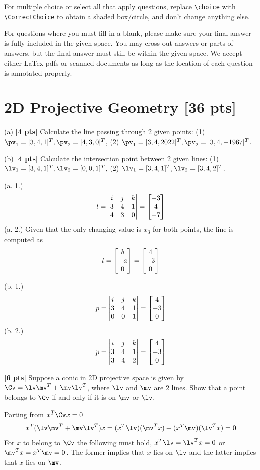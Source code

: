 \documentclass[11pt]{exam}
\numberwithin{equation}{section} %
\numberwithin{figure}{section} %
\numberwithin{table}{section} %
\begin{document}
For multiple choice or select all that apply questions, replace
\lstinline{\choice} with \lstinline{\CorrectChoice} to obtain a shaded
box/circle, and don't change anything else.

For questions where you must fill in a blank, please make sure your final
answer is fully included in the given space. You may cross out answers or parts
of answers, but the final answer must still be within the given space. We
accept either LaTex pdfs or scanned documents as long as the location of each
question is annotated properly.

\clearpage

\section{2D Projective Geometry  [36 pts]}
\begin{questions}

    \question (a) \textbf{[4 pts]} Calculate the line passing through 2 given points: (1) $\pv_1= [3,4,1]^T, \pv_2 = [4,3,0]^T$, (2) $\pv_1= [3,4,2022]^T, \pv_2 = [3,4,-1967]^T$.

    (b) \textbf{[4 pts]} Calculate the intersection point between 2 given lines: (1) $\lv_1 = [3,4,1]^T, \lv_2 = [0,0,1]^T $, (2) $\lv_1= [3,4,1]^T, \lv_2 = [3,4,2]^T$.

    \begin{tcolorbox}[height fill, width=\textwidth, blank, borderline={0.5pt}{-2pt},halign=left, valign=top, nobeforeafter, size=normal]
        (a. 1.)
        \[
            l = \left|\begin{matrix} i & j & k \\ 3 & 4 & 1 \\ 4 & 3 & 0 \end{matrix}\right| = \begin{bmatrix} -3 \\ 4 \\ -7 \end{bmatrix}
        \]
        (a. 2.) Given that the only changing value is $x_3$ for both points, the line is computed as
        \[
            l = \begin{bmatrix} b \\ -a \\ 0 \end{bmatrix} = \begin{bmatrix} 4 \\ -3 \\ 0 \end{bmatrix}
        \]

        (b. 1.)
        \[
            p = \left|\begin{matrix} i & j & k \\ 3 & 4 & 1 \\ 0 & 0 & 1 \end{matrix}\right| = \begin{bmatrix} 4 \\ -3 \\ 0 \end{bmatrix}
        \]
        (b. 2.)
        \[
            p = \left|\begin{matrix} i & j & k \\ 3 & 4 & 1 \\ 3 & 4 & 2 \end{matrix}\right| = \begin{bmatrix} 4 \\ -3 \\ 0 \end{bmatrix}
        \]
    \end{tcolorbox}

    \question\textbf{[6 pts]} Suppose a conic in 2D projective space is given by $\Cv = \lv\mv^T + \mv\lv^T$, where $\lv$ and $\mv$ are 2 lines. Show that a point belongs to $\Cv$ if and only if it is on $\mv$ or $\lv$.

    \begin{tcolorbox}[height fill, width=\textwidth, blank, borderline={0.5pt}{-2pt},halign=left, valign=top, nobeforeafter, size=normal]
        Parting from $x^T \Cv x = 0$
        \[
            x^T (\lv\mv^T + \mv\lv^T) x = (x^T \lv) (\mv^T x) + (x^T \mv) (\lv^T x) = 0
        \]
        For $x$ to belong to $\Cv$ the following must hold, $x^T \lv = \lv^T x = 0$ or $\mv^T x = x^T \mv = 0$. The former implies that $x$ lies on $\lv$ and the latter implies that $x$ lies on $\mv$.
    \end{tcolorbox}


\end{questions}
\end{document}
